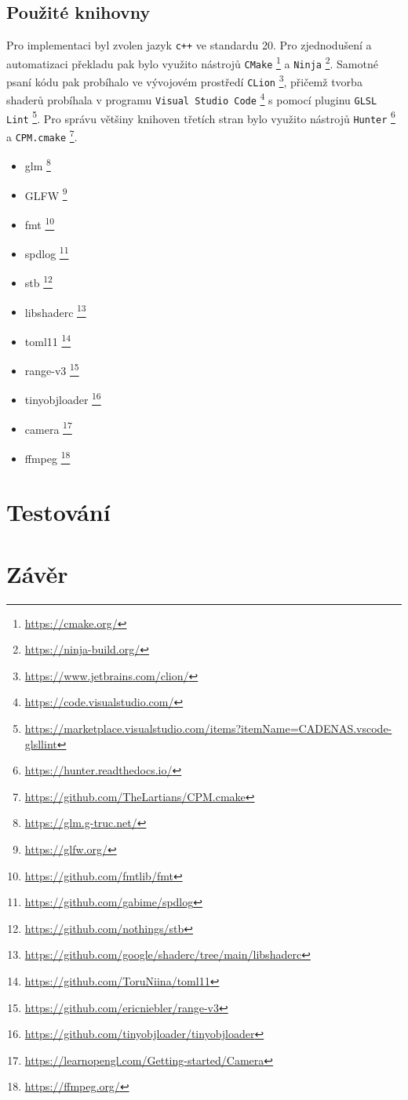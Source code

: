 \section{Použité knihovny}
Pro implementaci byl zvolen jazyk \texttt{c++} ve standardu 20. Pro zjednodušení a automatizaci překladu pak bylo využito nástrojů \texttt{CMake} \footnote{\url{https://cmake.org/}} a \texttt{Ninja} \footnote{\url{https://ninja-build.org/}}. Samotné psaní kódu pak probíhalo ve vývojovém prostředí \texttt{CLion} \footnote{\url{https://www.jetbrains.com/clion/}}, přičemž tvorba shaderů probíhala v programu \texttt{Visual Studio Code} \footnote{\url{https://code.visualstudio.com/}} s pomocí pluginu \texttt{GLSL Lint} \footnote{\url{https://marketplace.visualstudio.com/items?itemName=CADENAS.vscode-glsllint}}. Pro správu většiny knihoven třetích stran bylo využito nástrojů \texttt{Hunter} \footnote{\url{https://hunter.readthedocs.io/}} a \texttt{CPM.cmake} \footnote{\url{https://github.com/TheLartians/CPM.cmake}}.
\begin{multicols}{2}
    \begin{itemize}
        \item glm \footnote{\url{https://glm.g-truc.net/}}
        \item GLFW \footnote{\url{https://glfw.org/}}
        \item {fmt} \footnote{\url{https://github.com/fmtlib/fmt}}
        \item spdlog \footnote{\url{https://github.com/gabime/spdlog}}
        \item stb \footnote{\url{https://github.com/nothings/stb}}
        \item libshaderc \footnote{\url{https://github.com/google/shaderc/tree/main/libshaderc}}
        \item toml11 \footnote{\url{https://github.com/ToruNiina/toml11}}
        \item range-v3 \footnote{\url{https://github.com/ericniebler/range-v3}}
        \item tinyobjloader \footnote{\url{https://github.com/tinyobjloader/tinyobjloader}}
        \item camera \footnote{\url{https://learnopengl.com/Getting-started/Camera}}
        \item ffmpeg \footnote{\url{https://ffmpeg.org/}}
    \end{itemize}
\end{multicols}
\chapter{Testování}
\label{chapter:testovani}

\chapter{Závěr}
\label{chapter:zaver}





